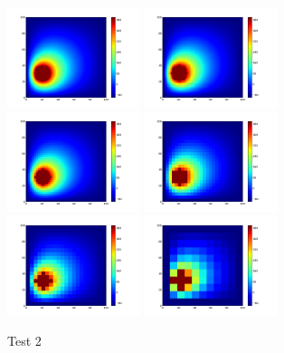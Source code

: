\documentclass[a4paper]{article}
\begin{document}
\begin{figure}[htbp]
\includegraphics[width=110pt]{img/Parabrisas2-1.png} \includegraphics[width=110pt]{img/Parabrisas2-2.png} \includegraphics[width=110pt]{img/Parabrisas2-2,5.png} \newline \includegraphics[width=110pt]{img/Parabrisas2-4.png} \includegraphics[width=110pt]{img/Parabrisas2-5.png} \includegraphics[width=110pt]{img/Parabrisas2-10.png} \newline
\caption{Test 2}
\end{figure}
\end{document}
